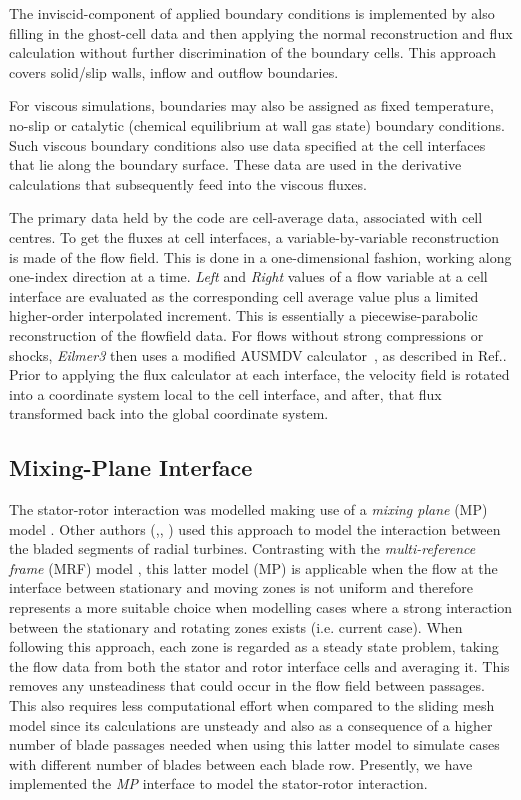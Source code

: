 \documentclass[12pt,a4paper,twoside]{article}
\begin{document}
The inviscid-component of applied boundary conditions is implemented by also filling in 
the ghost-cell data and then applying the normal reconstruction and flux calculation without
further discrimination of the boundary cells.
This approach covers solid/slip walls, inflow and outflow boundaries.

For viscous simulations, boundaries may also be assigned as fixed temperature, 
no-slip or catalytic (chemical equilibrium at wall gas state) boundary conditions.
Such viscous boundary conditions also use data specified at the cell interfaces
that lie along the boundary surface.
These data are used in the derivative calculations that subsequently feed into 
the viscous fluxes.

The primary data held by the code are cell-average data, associated with cell centres.
To get the fluxes at cell interfaces, a variable-by-variable reconstruction is made of the flow field.
This is done in a one-dimensional fashion, working along one-index direction at a time.
\textit{Left} and \textit{Right} values of a flow variable at a cell interface
are evaluated as the corresponding cell average value plus a limited higher-order interpolated increment.
This is essentially a piecewise-parabolic reconstruction of the flowfield data.
For flows without strong compressions or shocks, 
\textit{Eilmer3} then uses a modified AUSMDV calculator~\cite{wada_liou_94a},
as described in Ref.\cite{jacobs_etal_2010b}.
Prior to applying the flux calculator at each interface, 
the velocity field is rotated into a coordinate system local to the cell interface, 
and after, that flux transformed back into the global coordinate system.

\subsection{Mixing-Plane Interface}
%
The stator-rotor interaction was modelled making use of a \textit{mixing plane} (MP) model \cite{Denton_1979}. 
Other authors (\cite{Barr_2009},\cite{Qiu_2009}, \cite{Li_2006}) used this approach to model the interaction between the bladed segments of radial turbines.
Contrasting with the \textit{multi-reference frame} (MRF) model \cite{Luo_1994}, this latter model (MP) is applicable when the flow at the interface between stationary and moving zones is not uniform and therefore represents a more suitable choice when modelling cases where a strong interaction between the stationary and rotating zones exists (i.e. current case). 
When following this approach, each zone is regarded as a steady state problem, taking the flow data from both the stator and rotor interface cells and averaging it. 
This removes any unsteadiness that could occur in the flow field between passages. 
This also requires less computational effort when compared to the sliding mesh model since its calculations are unsteady and also as a consequence of a higher number of blade passages needed when using this latter model to simulate cases with different number of blades between each blade row.
Presently, we have implemented the \textit{MP} interface to model the stator-rotor interaction.
\end{document}
